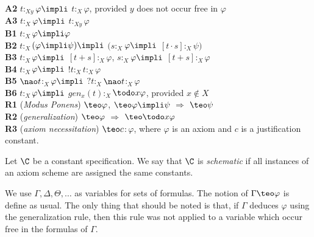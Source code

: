 \textbf{A2} $t$$:_{Xy}$$\varphi \impli$ $t$$:_{X}$$\varphi$, provided $y$ does not occur free in $\varphi$\\

\textbf{A3} $t$$:_{X}$$\varphi \impli$ $t$$:_{Xy}$$\varphi$ \\

\textbf{B1} $t$$:_{X}$$\varphi \impli \varphi$\\

\textbf{B2} $t$$:_{X}$$(\varphi \impli \psi) \impli$ $(s$$:_{X}$$\varphi \impli$ $[t\cdot s]$$:_{X}$$\psi)$\\

\textbf{B3} $t$$:_{X}$$\varphi \impli$ $[t+s]$$:_{X}$$\varphi$, $s$$:_{X}$$\varphi \impli$ $[t+s]$$:_{X}$$\varphi$\\ 

\textbf{B4} $t$$:_{X}$$\varphi \impli$ $!t$$:_{X}$$t$$:_{X}$$\varphi$\\


\textbf{B5} $\nao t$$:_{X}$$\varphi \impli$ $?t$$:_{X}$$\nao t$$:_{X}$$\varphi$\\


\textbf{B6} $t$$:_{X}$$\varphi \impli$ $gen_{x}(t)$$:_{X}$$ \todo x \varphi$, provided $x \notin X$\\


\textbf{R1} (\textit{Modus Ponens}) $\teo \varphi$, $\teo \varphi\impli\psi$ $\Rightarrow$ $\teo \psi$ \\

\textbf{R2} (\textit{generalization})  $\teo \varphi$ $\Rightarrow$ $\teo \todo x \varphi$ \\

\textbf{R3} (\textit{axiom necessitation})  $\teo c$$:$$\varphi$, where $\varphi$ is an axiom and $c$ is a justification constant.\\

\begin{defn}
Let $\C$ be a constant specification. We say that $\C$ is \textit{schematic} if all instances of an axiom scheme are assigned the same constants.  
\end{defn}


\qquad We use $\Gamma, \Delta, \Theta, \dots$ as variables for sets of formulas. The notion of $\Gamma \teo \varphi$ is define as usual. The only thing that should be noted is that, if $\Gamma$ deduces $\varphi$ using the generalization rule, then this rule was not applied to a variable which occur free in the formulas of $\Gamma$. 


